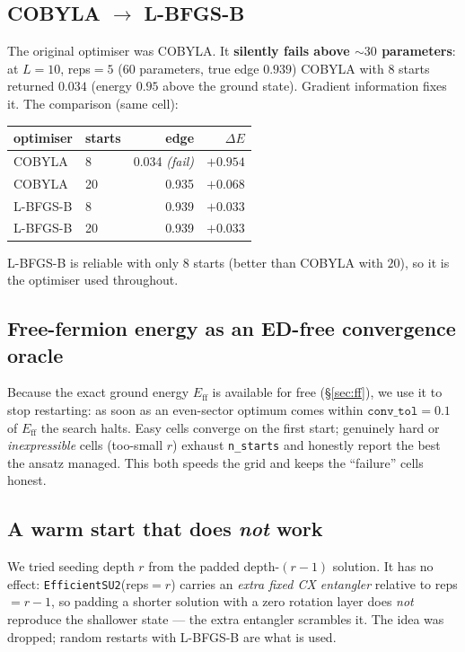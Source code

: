 \documentclass[11pt]{article}
\newcommand{\code}[1]{\texttt{#1}}
\begin{document}
\subsection{COBYLA \texorpdfstring{$\to$}{->} L-BFGS-B}
The original optimiser was COBYLA. It \textbf{silently fails above ${\sim}30$
parameters}: at $L=10$, reps${}=5$ ($60$ parameters, true edge $0.939$) COBYLA
with $8$ starts returned $0.034$ (energy $0.95$ above the ground state). Gradient
information fixes it. The comparison (same cell):
\begin{center}
\begin{tabular}{llrr}
\toprule
optimiser & starts & edge & $\Delta E$ \\
\midrule
COBYLA    & 8  & 0.034 \emph{(fail)} & $+0.954$ \\
COBYLA    & 20 & 0.935 & $+0.068$ \\
L-BFGS-B  & 8  & 0.939 & $+0.033$ \\
L-BFGS-B  & 20 & 0.939 & $+0.033$ \\
\bottomrule
\end{tabular}
\end{center}
L-BFGS-B is reliable with only $8$ starts (better than COBYLA with $20$), so it
is the optimiser used throughout.

\subsection{Free-fermion energy as an ED-free convergence oracle}
Because the exact ground energy $E_{\mathrm{ff}}$ is available for free
(\S\ref{sec:ff}), we use it to stop restarting: as soon as an even-sector optimum
comes within $\code{conv\_tol}=0.1$ of $E_{\mathrm{ff}}$ the search halts. Easy
cells converge on the first start; genuinely hard or \emph{inexpressible} cells
(too-small $r$) exhaust \code{n\_starts} and honestly report the best the ansatz
managed. This both speeds the grid and keeps the ``failure'' cells honest.

\subsection{A warm start that does \emph{not} work}
We tried seeding depth $r$ from the padded depth-$(r{-}1)$ solution. It has no
effect: \code{EfficientSU2}(reps${}=r$) carries an \emph{extra fixed CX
entangler} relative to reps${}=r{-}1$, so padding a shorter solution with a zero
rotation layer does \emph{not} reproduce the shallower state --- the extra
entangler scrambles it. The idea was dropped; random restarts with L-BFGS-B are
what is used.
\end{document}
